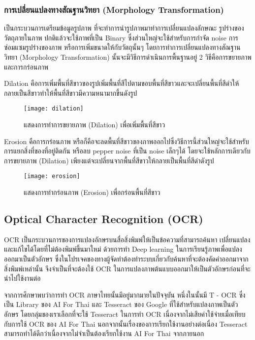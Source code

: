 \subsubsection{การเปลี่ยนแปลงทางสัณฐานวิทยา (Morphology Transformation)}

เป็นกระบวนการเตรียมข้อมูลรูปภาพ  ที่จะทำการนำรูปภาพมาทำการเปลี่ยนแปลงลักษณะ รูปร่างของวัตถุภายในภาพ ปกติแล้วจะใช้ภาพที่เป็น Binary ซึ่งส่วนใหญ่จะใช้สำหรับการกำจัด 
noise การซ่อมแซมรูปร่างของภาพ หรือการเพิ่มขนาดให้กับวัตถุนั้นๆ โดยการทำการเปลี่ยนแปลงทางสัณฐานวิทยา (Morphology Transformation) นั้นจะมีวิธีการดำเนินการพื้นฐานอยู่ 2 วิธีคือการขยายภาพ และการกร่อนภาพ

Dilation คือการเพิ่มพื้นที่สีขาวของรูปเพิ่มพื้นที่สีไปตามขอบพื้นที่สีขาวและจะเปลี่ยนพื้นที่สีดำให้กลายเป็นสีขาวทำให้พื้นที่สีขาวมีความหนามากขึ้นดังรูป 

\begin{figure}[H]
    \centering
    \texttt{[image: dilation]}
    \caption{แสดงการทำการขยายภาพ (Dilation) เพื่อเพิ่มพื้นที่สีขาว}\label{fig:Dilation}
\end{figure}

Erosion คือการกร่อนภาพ หรือก็คือจะลดพื้นที่สีขาวของภาพออกไปซึ่งวิธีการนี้ส่วนใหญ่จะใช้สำหรับการแยกสิ่งที่ของที่อยู่ติดกัน หรือลบ pepper noise ที่เป็น noise เล็กๆได้ โดยจะใช้หลักการเดียวกับการขยายภาพ  (Dilation) เพียงแต่จะเปลี่ยนจากพื้นที่สีขาวให้กลายเป็นพื้นที่สีดำดังรูป

\begin{figure}[H]
    \centering
    \texttt{[image: erosion]}
    \caption{แสดงการทำกร่อนภาพ (Erosion) เพื่อกร่อนพื้นที่สีขาว}\label{fig:Erosion}
\end{figure}

\subsection{Optical Character Recognition (OCR)}

OCR เป็นกระบวนการของการแปลงอักษรบนสื่อสิ่งพิมพ์ให้เป็นข้อความที่สามารถค้นหา เปลี่ยนแปลงและแก้ไขได้โดยที่ไม่ต้องพิมพ์ขึ้นมาใหม่ ด้วยการทำ Deep learning ในการเรียนรู้ภาพเพื่อแปลงออกมาเป็นตัวอักษร ซึ่งในโปรเจคของทางผู้จัดทำต้องทำระบบเกี่ยวกับค้นหาที่จะต้องคัดคำออกมาจากสิ่งพิมพ์เหล่านั้น จึงจำเป็นที่จะต้องใช้ OCR ในการแปลงภาพต้นแบบออกมาให้เป็นตัวอักษรก่อนที่จะนำไปใช้งานต่อ

จากการศึกษาพบว่าการทำ OCR ภาษาไทยนั้นมีอยู่มากมายในปัจจุบัน หนึ่งในนั้นมี T - OCR ซึ่งเป็น Library ของ AI For Thai \cite{nectec} และ Tesseract ของ Google \cite{google} ที่ใช้สำหรับแปลงภาพเป็นตัวอักษร โดยกลุ่มของเราเลือกที่จะใช้ Tesseract ในการทำ OCR เนื่องจากไม่เสียค่าใช้จ่ายเมื่อเทียบกับการใช้ OCR ของ AI For Thai นอกจากนั้นเรื่องของการเรียกใช้งานอย่างต่อเนื่อง Tesseract สามารถทำได้ดีกว่าเนื่องจากไม่จำเป็นต้องเรียกใช้งาน AI For Thai จากภายนอก


